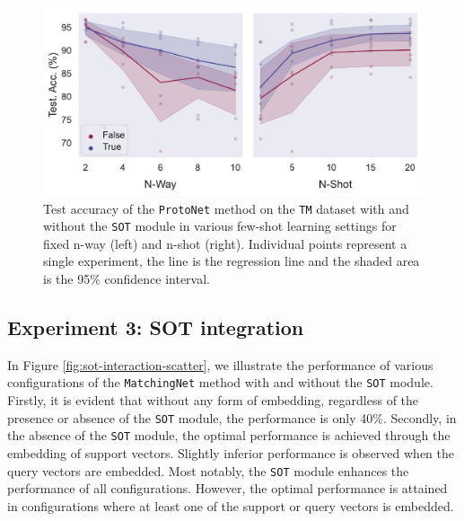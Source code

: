 \begin{figure}[h!]
    \centering
    \includegraphics[width=1\columnwidth]{../figures/way-shot.pdf}
    \caption{Test accuracy of the \texttt{ProtoNet} method on the \texttt{TM} dataset with and without the \texttt{SOT} module in various few-shot learning settings for fixed n-way (left) and n-shot (right). Individual points represent a single experiment, the line is the regression line and the shaded area is the 95\% confidence interval.}
    \label{fig:way-shot}
\end{figure}

\subsection{Experiment 3: SOT integration}

In Figure \ref{fig:sot-interaction-scatter}, we illustrate the performance of various 
configurations of the \texttt{MatchingNet} method with and without the \texttt{SOT} 
module. Firstly, it is evident that without any form of embedding, regardless of the presence or 
absence of the \texttt{SOT} module, the performance is only 40\%. Secondly, in the absence of the 
\texttt{SOT} module, the optimal performance is achieved through the embedding of support vectors. 
Slightly inferior performance is observed when the query vectors are embedded. 
Most notably, the \texttt{SOT} module enhances the performance of all configurations. 
However, the optimal performance is attained in configurations where at least one of the 
support or query vectors is embedded.

